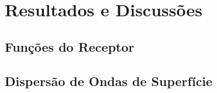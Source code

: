\chapter*{Resultados e Discussões}	

\section*{Funções do Receptor}
\section*{Dispersão de Ondas de Superfície}
